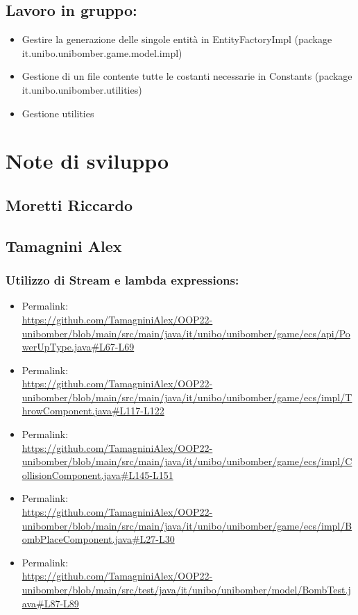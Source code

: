 \documentclass[a4paper,12pt]{report}
\begin{document}
\subsection*{Lavoro in gruppo:}
\begin{itemize}
    \item Gestire la generazione delle singole entità in EntityFactoryImpl (package it.unibo.unibomber.game.model.impl)
    \item Gestione di un file contente tutte le costanti necessarie in Constants (package it.unibo.unibomber.utilities)
    \item Gestione utilities
\end{itemize}

\section{Note di sviluppo}
\subsection*{Moretti Riccardo}

\subsection*{Tamagnini Alex}
\subsubsection*{Utilizzo di Stream e lambda expressions:}
\begin{itemize}
    \item Permalink: 
    \\ \url{https://github.com/TamagniniAlex/OOP22-unibomber/blob/main/src/main/java/it/unibo/unibomber/game/ecs/api/PowerUpType.java#L67-L69}
    \item Permalink: 
    \\ \url{https://github.com/TamagniniAlex/OOP22-unibomber/blob/main/src/main/java/it/unibo/unibomber/game/ecs/impl/ThrowComponent.java#L117-L122}
    \item Permalink: 
    \\ \url{https://github.com/TamagniniAlex/OOP22-unibomber/blob/main/src/main/java/it/unibo/unibomber/game/ecs/impl/CollisionComponent.java#L145-L151}
    \item Permalink: 
    \\ \url{https://github.com/TamagniniAlex/OOP22-unibomber/blob/main/src/main/java/it/unibo/unibomber/game/ecs/impl/BombPlaceComponent.java#L27-L30}
    \item Permalink: 
    \\ \url{https://github.com/TamagniniAlex/OOP22-unibomber/blob/main/src/test/java/it/unibo/unibomber/model/BombTest.java#L87-L89}
\end{itemize}
\end{document}
